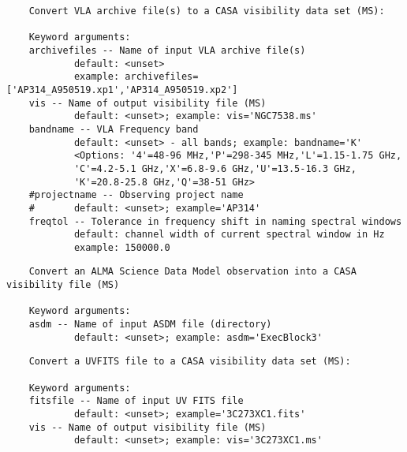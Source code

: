 \vspace{3mm}
\small
\begin{verbatim}
    Convert VLA archive file(s) to a CASA visibility data set (MS):
    
    Keyword arguments:
    archivefiles -- Name of input VLA archive file(s)
            default: <unset>
            example: archivefiles=['AP314_A950519.xp1','AP314_A950519.xp2']
    vis -- Name of output visibility file (MS)
            default: <unset>; example: vis='NGC7538.ms'
    bandname -- VLA Frequency band
            default: <unset> - all bands; example: bandname='K'
            <Options: '4'=48-96 MHz,'P'=298-345 MHz,'L'=1.15-1.75 GHz,
            'C'=4.2-5.1 GHz,'X'=6.8-9.6 GHz,'U'=13.5-16.3 GHz,
            'K'=20.8-25.8 GHz,'Q'=38-51 GHz>
    #projectname -- Observing project name
    #       default: <unset>; example='AP314'
    freqtol -- Tolerance in frequency shift in naming spectral windows
            default: channel width of current spectral window in Hz
            example: 150000.0

\end{verbatim}
\normalsize

\vspace{3mm}
\small
\begin{verbatim}
    Convert an ALMA Science Data Model observation into a CASA visibility file (MS)
    
    Keyword arguments:
    asdm -- Name of input ASDM file (directory)
            default: <unset>; example: asdm='ExecBlock3'
\end{verbatim}
\normalsize


\vspace{3mm}
\small
\begin{verbatim}
    Convert a UVFITS file to a CASA visibility data set (MS):
    
    Keyword arguments:
    fitsfile -- Name of input UV FITS file
            default: <unset>; example='3C273XC1.fits'
    vis -- Name of output visibility file (MS)
            default: <unset>; example: vis='3C273XC1.ms'
\end{verbatim}
\normalsize

